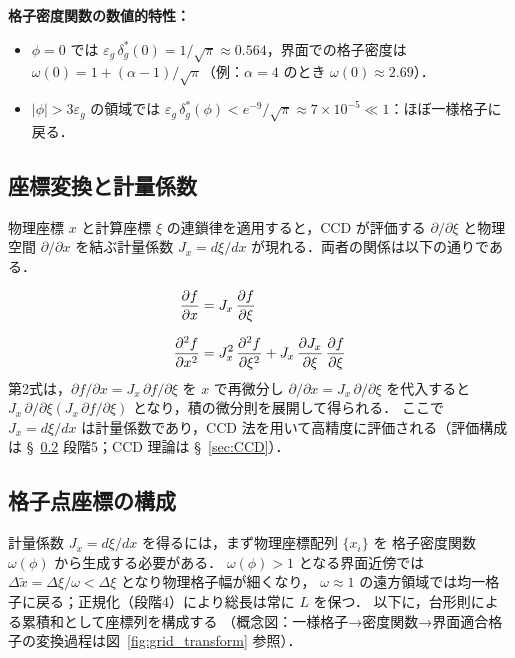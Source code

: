 \noindent\textbf{格子密度関数の数値的特性：}
\begin{itemize}
  \item $\phi = 0$ では $\varepsilon_g\,\delta_g^*(0) = 1/\sqrt{\pi} \approx 0.564$，界面での格子密度は $\omega(0) = 1 + (\alpha-1)/\sqrt{\pi}$（例：$\alpha = 4$ のとき $\omega(0) \approx 2.69$）．
  \item $|\phi| > 3\varepsilon_g$ の領域では $\varepsilon_g\,\delta_g^*(\phi) < e^{-9}/\sqrt{\pi} \approx 7\times10^{-5} \ll 1$：ほぼ一様格子に戻る．
\end{itemize}

\subsection{座標変換と計量係数}
\label{sec:grid_coord}

物理座標 $x$ と計算座標 $\xi$ の連鎖律を適用すると，CCD が評価する $\partial/\partial\xi$ と物理空間 $\partial/\partial x$ を結ぶ計量係数 $J_x = d\xi/dx$ が現れる．両者の関係は以下の通りである．

\begin{align}
 \dfrac{\partial f}{\partial x} &= J_x\,\dfrac{\partial f}{\partial \xi}
 \label{eq:transform_1st_correct} \\[6pt]
 \dfrac{\partial^2 f}{\partial x^2} &= J_x^2\,\dfrac{\partial^2 f}{\partial \xi^2} + J_x\,\dfrac{\partial J_x}{\partial \xi}\,\dfrac{\partial f}{\partial \xi}
 \label{eq:transform_2nd_correct}
\end{align}
第2式は，$\partial f/\partial x = J_x\,\partial f/\partial\xi$ を $x$ で再微分し $\partial/\partial x = J_x\,\partial/\partial\xi$ を代入すると $J_x\,\partial/\partial\xi(J_x\,\partial f/\partial\xi)$ となり，積の微分則を展開して得られる．
ここで $J_x = d\xi/dx$ は計量係数であり，CCD 法を用いて高精度に評価される（評価構成は §~\ref{sec:grid_gen} 段階5；CCD 理論は §~\ref{sec:CCD}）．

\subsection{格子点座標の構成}
\label{sec:grid_gen}

計量係数 $J_x = d\xi/dx$ を得るには，まず物理座標配列 $\{x_i\}$ を
格子密度関数 $\omega(\phi)$ から生成する必要がある．
$\omega(\phi) > 1$ となる界面近傍では $\Delta\tilde{x} = \Delta\xi/\omega < \Delta\xi$ となり物理格子幅が細くなり，
$\omega \approx 1$ の遠方領域では均一格子に戻る；正規化（段階4）により総長は常に $L$ を保つ．
以下に，台形則による累積和として座標列を構成する
（概念図：一様格子→密度関数→界面適合格子の変換過程は図~\ref{fig:grid_transform} 参照）．

